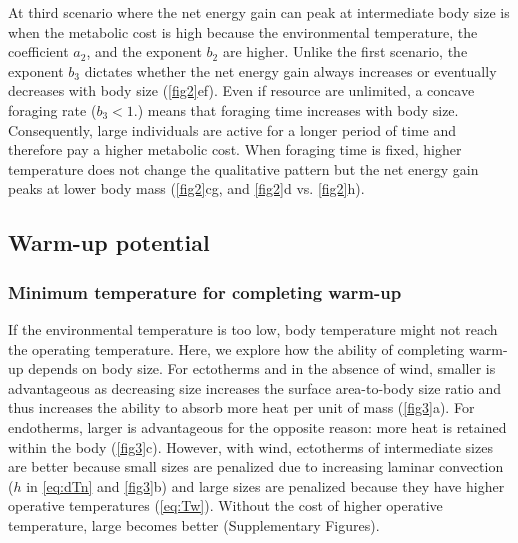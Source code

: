 At third scenario where the net energy gain can peak at intermediate body size is when the metabolic cost is high because the environmental temperature, the coefficient $a_2$, and the exponent $b_2$ are higher.
Unlike the first scenario, the exponent $b_3$ dictates whether the net energy gain always increases or eventually decreases with body size (\cref{fig2}ef).
Even if resource are unlimited, a concave foraging rate ($b_3 < 1.$) means that foraging time increases with body size.
Consequently, large individuals are active for a longer period of time and therefore pay a  higher metabolic cost.
When foraging time is fixed, higher temperature does not change the qualitative pattern but the net energy gain peaks at lower body mass (\cref{fig2}cg, and \cref{fig2}d vs. \cref{fig2}h).

\subsection*{Warm-up potential}

\subsubsection*{Minimum temperature for completing warm-up}
If the environmental temperature is too low, body temperature might not reach the operating temperature.
Here, we explore how the ability of completing warm-up depends on body size.
For ectotherms and in the absence of wind, smaller is advantageous as decreasing size increases the surface area-to-body size ratio and thus increases the ability to absorb more heat per unit of mass  (\cref{fig3}a).
For endotherms, larger is advantageous for the opposite reason: more heat is retained within the body  (\cref{fig3}c).
However, with wind, ectotherms of intermediate sizes are better because small sizes are penalized due to increasing laminar convection ($h$ in \cref{eq:dTn} and \cref{fig3}b)  and large sizes are penalized because they have higher operative temperatures (\cref{eq:Tw}).
Without the cost of higher operative temperature, large becomes better (Supplementary Figures).

